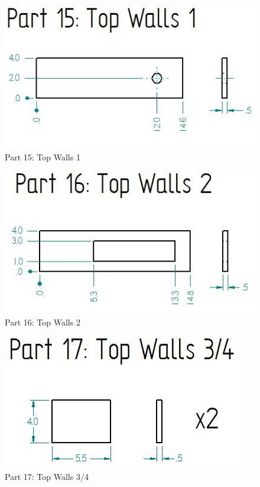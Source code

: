 \documentclass[12pt, titlepage]{article}
\begin{document}
\begin{figure}[H]
    \centerline{\includegraphics[scale=.5]{Part 15.jpg}}
    \caption{Part 15: Top Walls 1}
    \label{fig}
\end{figure}

\begin{figure}[H]
    \centerline{\includegraphics[scale=.5]{Part 16.jpg}}
    \caption{Part 16: Top Walls 2}
    \label{fig}
\end{figure}

\begin{figure}[H]
    \centerline{\includegraphics[scale=.5]{Part 17.jpg}}
    \caption{Part 17: Top Walls 3/4}
    \label{fig}
\end{figure}
\end{document}
